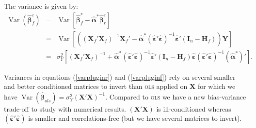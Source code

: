 \documentclass[12pt,a4paper]{report}
\begin{document}
The variance is given by:
	\begin{eqnarray}
		\operatorname{Var}(\hat{\boldsymbol{\beta}}_f^{\varepsilon})&=&\operatorname{Var}[\hat{\boldsymbol{\beta}}^*_f-\hat{\boldsymbol{\alpha}}^*\hat{\boldsymbol{\beta}}_{r}^{\varepsilon}] \nonumber \\
		&=&\operatorname{Var}\left[\left((\boldsymbol{X}_f'\boldsymbol{X}_f)^{-1}\boldsymbol{X}_f'-\hat{\boldsymbol{\alpha}}^*(\hat{\boldsymbol{\varepsilon}}'\hat{\boldsymbol{\varepsilon}})^{-1}\hat{\boldsymbol{\varepsilon}}'(\boldsymbol{I}_n-\boldsymbol{H}_f)\right)\boldsymbol{Y}\right]  \nonumber \\
		&=&\sigma_Y^2[(\boldsymbol{X}_f'\boldsymbol{X}_f)^{-1}+\hat{\boldsymbol{\alpha}}^*(\hat{\boldsymbol{\varepsilon}}'\hat{\boldsymbol{\varepsilon}})^{-1}\hat{\boldsymbol{\varepsilon}}'(\boldsymbol{I}_n-\boldsymbol{H}_f)\hat{\boldsymbol{\varepsilon}}(\hat{\boldsymbol{\varepsilon}}'\hat{\boldsymbol{\varepsilon}})^{-1}(\hat{\boldsymbol{\alpha}}^*)']. \label{varpluginf}
	\end{eqnarray}

Variances in equations (\ref{varpluginr}) and (\ref{varpluginf}) rely on several smaller and better conditioned matrices to invert than \textsc{ols} applied on $\boldsymbol{X}$ for which we have $\operatorname{Var}(\hat{\boldsymbol{\beta}}_{ols})=\sigma_Y^2(\boldsymbol{X}'\boldsymbol{X})^{-1}$. Compared to \textsc{ols}  we have a new bias-variance trade-off to study with numerical results. $(\boldsymbol{X}'\boldsymbol{X})$ is ill-conditioned whereas $(\hat{\boldsymbol{\varepsilon}}'\hat{\boldsymbol{\varepsilon}})$ is smaller and correlations-free (but we have several matrices to invert).\\
\end{document}
